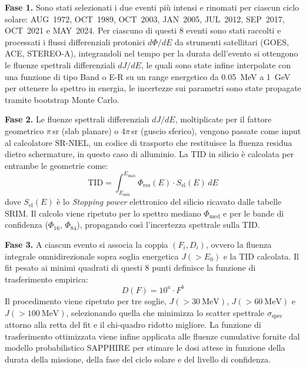 \documentclass[a4paper,12pt]{article}
\begin{document}
\noindent\textbf{Fase 1.} Sono stati selezionati i due eventi più intensi e rinomati per ciascun ciclo solare: 
AUG~1972, OCT~1989, OCT~2003, JAN~2005, JUL~2012, SEP~2017, OCT~2021 e MAY~2024. Per ciascuno di 
questi 8 eventi sono stati raccolti e processati i flussi differenziali protonici $d\Phi/dE$ da strumenti satellitari (GOES, ACE, STEREO-A), integrandoli nel tempo per la durata dell'evento si ottengono le fluenze spettrali differenziali $dJ/dE$, le quali sono state infine interpolate con una funzione di tipo Band \cite{Band1993} o E-R \cite{EllisonRamaty1985} su un range energetico da \qty{0.05}{\mega\electronvolt} 
a \qty{1}{\giga\electronvolt} per ottenere lo spettro in energia, le incertezze sui parametri sono state propagate tramite bootstrap Monte Carlo.

\noindent\textbf{Fase 2.} Le fluenze spettrali differenziali $dJ/dE$, moltiplicate per il 
fattore geometrico $\pi$\,sr (slab planare) o $4\pi$\,sr (guscio sferico), vengono passate 
come input al calcolatore SR-NIEL, un codice di trasporto che restituisce la fluenza residua dietro schermature, in questo caso di alluminio. La TID in silicio è calcolata per entrambe le geometrie come:
\begin{equation}
    \mathrm{TID} = \int_{E_{\min}}^{E_{\max}} \Phi_{\mathrm{res}}(E)\cdot S_{\mathrm{el}}(E)\,dE
\end{equation}
dove $S_\mathrm{el}(E)$ è lo \textit{Stopping power} elettronico del silicio ricavato dalle tabelle SRIM. 
Il calcolo viene ripetuto per lo spettro mediano $\Phi_\mathrm{med}$ e per le bande di confidenza 
($\Phi_{16}$, $\Phi_{84}$), propagando così l'incertezza spettrale sulla TID.


\noindent\textbf{Fase 3.} A ciascun evento si associa la coppia $(F_i, D_i)$, ovvero la fluenza 
integrale omnidirezionale sopra soglia energetica $J(>E_0)$ e la TID calcolata. Il fit pesato ai minimi 
quadrati di questi 8 punti definisce la funzione di trasferimento empirica:
\begin{equation}
    D(F) = 10^{a} \cdot F^{b}
\end{equation}
Il procedimento viene ripetuto per tre soglie, $J(>\qty{30}{\mega\electronvolt})$, 
$J(>\qty{60}{\mega\electronvolt})$ e $J(>\qty{100}{\mega\electronvolt})$, selezionando quella 
che minimizza lo scatter spettrale $\sigma_{\text{spec}}$ attorno alla retta del fit e il chi-quadro ridotto migliore. 
La funzione di trasferimento ottimizzata viene infine applicata alle fluenze cumulative fornite 
dal modello probabilistico SAPPHIRE per stimare le dosi attese in funzione della durata della 
missione, della fase del ciclo solare e del livello di confidenza.
\end{document}
